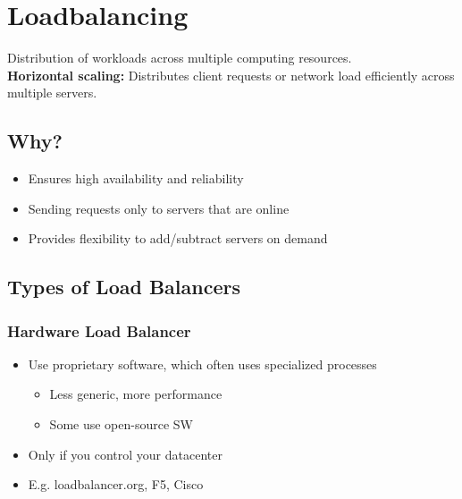 \usepackage{graphicx}%

\section{Loadbalancing}
Distribution of workloads across multiple computing resources.\\
\textbf{Horizontal scaling:} Distributes client requests or network load efficiently across multiple servers.\\

\subsection{Why?}
\begin{itemize}
    \item Ensures high availability and reliability
    \item Sending requests only to servers that are online
    \item Provides flexibility to add/subtract servers on demand
\end{itemize}

\subsection{Types of Load Balancers}
\subsubsection{Hardware Load Balancer}
\begin{itemize}
    \item Use proprietary software, which often uses specialized processes
    \begin{itemize}
        \item Less generic, more performance
        \item Some use open-source SW
    \end{itemize}
    \item Only if you control your datacenter
    \item E.g. loadbalancer.org, F5, Cisco
\end{itemize}

